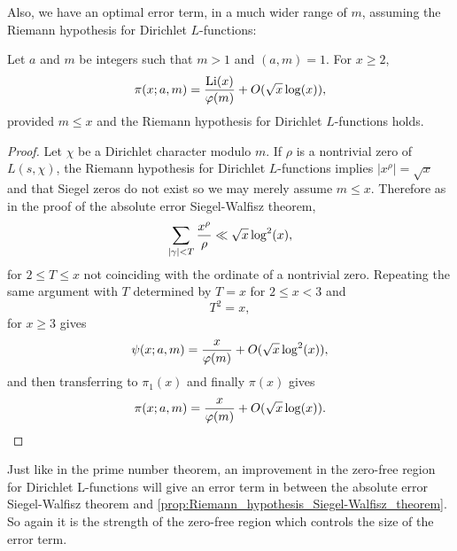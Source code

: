     Also, we have an optimal error term, in a much wider range of $m$, assuming the Riemann hypothesis for Dirichlet $L$-functions:
    
    \begin{proposition}\label{prop:Riemann_hypothesis_Siegel-Walfisz_theorem}
      Let $a$ and $m$ be integers such that $m > 1$ and $(a,m) = 1$. For $x \ge 2$,
      \[
        \pi(x;a,m) = \frac{\operatorname{\mathrm{Li}}(x)}{\varphi(m)}+O(\sqrt{x}\log(x)),
      \]
      provided $m \le x$ and the Riemann hypothesis for Dirichlet $L$-functions holds.
    \end{proposition}
    \begin{proof}
      Let $\chi$ be a Dirichlet character modulo $m$. If $\rho$ is a nontrivial zero of $L(s,\chi)$, the Riemann hypothesis for Dirichlet $L$-functions implies $|x^{\rho}| = \sqrt{x}$ and that Siegel zeros do not exist so we may merely assume $m \le x$. Therefore as in the proof of the absolute error Siegel-Walfisz theorem,
      \[
        \sum_{|\gamma| < T}\frac{x^{\rho}}{\rho} \ll \sqrt{x}\log^{2}(x),
      \]
      for $2 \le T \le x$ not coinciding with the ordinate of a nontrivial zero. Repeating the same argument with $T$ determined by $T = x$ for $2 \le x < 3$ and 
      \[
        T^{2} = x,
      \]
      for $x \ge 3$ gives
      \[
        \psi(x;a,m) = \frac{x}{\varphi(m)}+O(\sqrt{x}\log^{2}(x)),
      \]
      and then transferring to $\pi_{1}(x)$ and finally $\pi(x)$ gives
      \[
        \pi(x;a,m) = \frac{x}{\varphi(m)}+O(\sqrt{x}\log(x)).
      \]
      \end{proof}

      Just like in the prime number theorem, an improvement in the zero-free region for Dirichlet L-functions will give an error term in between the absolute error Siegel-Walfisz theorem and \cref{prop:Riemann_hypothesis_Siegel-Walfisz_theorem}. So again it is the strength of the zero-free region which controls the size of the error term.